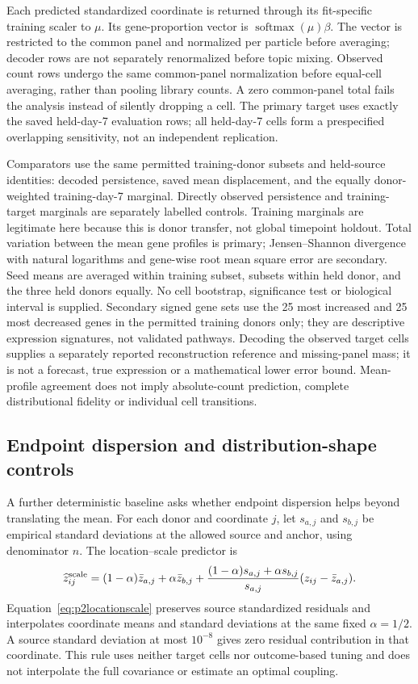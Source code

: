 Each predicted standardized coordinate is returned through its fit-specific training scaler to $\mu$. Its gene-proportion vector is $\operatorname{softmax}(\mu)\beta$. The vector is restricted to the common panel and normalized per particle before averaging; decoder rows are not separately renormalized before topic mixing. Observed count rows undergo the same common-panel normalization before equal-cell averaging, rather than pooling library counts. A zero common-panel total fails the analysis instead of silently dropping a cell. The primary target uses exactly the saved held-day-7 evaluation rows; all held-day-7 cells form a prespecified overlapping sensitivity, not an independent replication.

Comparators use the same permitted training-donor subsets and held-source identities: decoded persistence, saved mean displacement, and the equally donor-weighted training-day-7 marginal. Directly observed persistence and training-target marginals are separately labelled controls. Training marginals are legitimate here because this is donor transfer, not global timepoint holdout. Total variation between the mean gene profiles is primary; Jensen--Shannon divergence with natural logarithms and gene-wise root mean square error are secondary. Seed means are averaged within training subset, subsets within held donor, and the three held donors equally. No cell bootstrap, significance test or biological interval is supplied. Secondary signed gene sets use the 25 most increased and 25 most decreased genes in the permitted training donors only; they are descriptive expression signatures, not validated pathways. Decoding the observed target cells supplies a separately reported reconstruction reference and missing-panel mass; it is not a forecast, true expression or a mathematical lower error bound. Mean-profile agreement does not imply absolute-count prediction, complete distributional fidelity or individual cell transitions.

\subsection{Endpoint dispersion and distribution-shape controls}
A further deterministic baseline asks whether endpoint dispersion helps beyond translating the mean. For each donor and coordinate $j$, let $s_{a,j}$ and $s_{b,j}$ be empirical standard deviations at the allowed source and anchor, using denominator $n$. The location--scale predictor is
\begin{equation}
\widehat z_{ij}^{\rm scale}=(1-\alpha)\bar z_{a,j}+\alpha\bar z_{b,j}
+\frac{(1-\alpha)s_{a,j}+\alpha s_{b,j}}{s_{a,j}}(z_{ij}-\bar z_{a,j}).\label{eq:p2locationscale}
\end{equation}
Equation~\eqref{eq:p2locationscale} preserves source standardized residuals and interpolates coordinate means and standard deviations at the same fixed $\alpha=1/2$. A source standard deviation at most $10^{-8}$ gives zero residual contribution in that coordinate. This rule uses neither target cells nor outcome-based tuning and does not interpolate the full covariance or estimate an optimal coupling.

